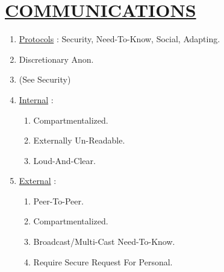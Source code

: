 \documentclass[11pt]{article}
\begin{document}
\section*{\ul{COMMUNICATIONS}}
\begin{enumerate}
	\item[] \ul{Protocols} : Security, Need-To-Know, Social, Adapting.
	
	\item[] Discretionary Anon.
	\item[] (See Security)
	
	\item[] \ul{Internal} :
	\begin{enumerate}
		\item[] Compartmentalized.
		\item[] Externally Un-Readable.
		\item[] Loud-And-Clear.
	\end{enumerate}

	\item[] \ul{External} :
	\begin{enumerate}
		\item[] Peer-To-Peer.
		\item[] Compartmentalized.
		\item[] Broadcast/Multi-Cast Need-To-Know.
		\item[] Require Secure Request For Personal.
	\end{enumerate}
\end{enumerate}
\end{document}
